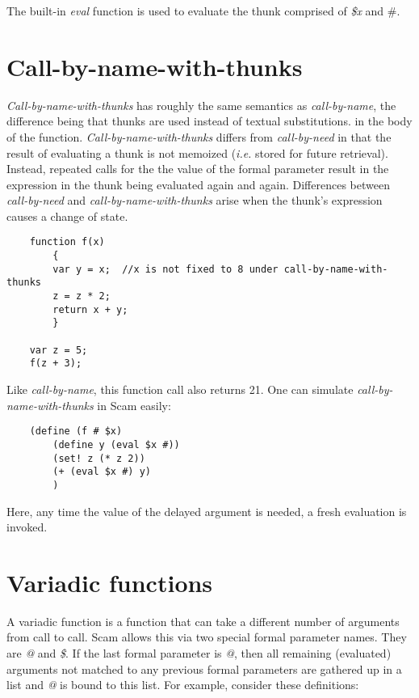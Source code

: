 The built-in {\it eval} function is used to evaluate the thunk
comprised of {\it \$x} and \#.

\section*{Call-by-name-with-thunks}

{\it Call-by-name-with-thunks} has roughly the same semantics
as {\it call-by-name}, the difference being
that thunks are used instead of textual substitutions.
in the body of the function. {\it Call-by-name-with-thunks} differs
from {\it call-by-need} in that the 
result of evaluating a thunk is not memoized ({\it i.e.} stored
for future retrieval). Instead, repeated
calls for the the value of the formal parameter result in the
expression in the thunk being evaluated again and again.
Differences between {\it call-by-need} and {\it call-by-name-with-thunks}
arise when the thunk's expression causes a change of state.

\begin{verbatim}
    function f(x)
        {
        var y = x;  //x is not fixed to 8 under call-by-name-with-thunks
        z = z * 2;
        return x + y;
        }

    var z = 5;
    f(z + 3);
\end{verbatim}

Like {\it call-by-name}, this function call also returns 21. One can simulate
{\it call-by-name-with-thunks} in Scam easily:

\begin{verbatim}
    (define (f # $x)
        (define y (eval $x #))
        (set! z (* z 2))
        (+ (eval $x #) y)
        )
\end{verbatim}

Here, any time the value of the delayed argument is needed, a fresh
evaluation is invoked.

\section{Variadic functions}

A variadic function is a function that can take a different
number of arguments from call to call.
Scam allows this via two special formal parameter names.
They are {\it @} and {\it \$}.
If the last formal parameter is {\it @}, then all remaining
(evaluated) arguments not matched to any previous formal
parameters are gathered up in a list and {\it @} is bound to this
list.  For example, consider these definitions:

